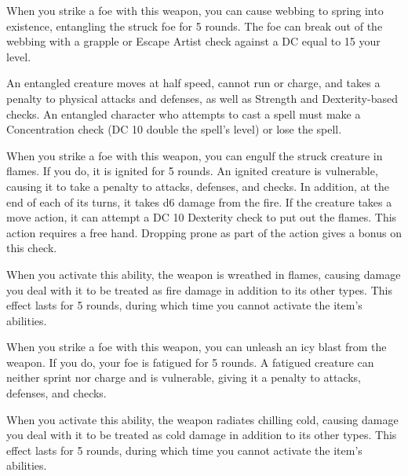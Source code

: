 
 When you strike a foe with this weapon, you can cause webbing to spring into existence, entangling the struck foe for 5 rounds. The foe can break out of the webbing with a grapple or Escape Artist check against a DC equal to 15 \add your level.

An entangled creature moves at half speed, cannot run or charge, and takes a  penalty to physical attacks and defenses, as well as Strength and Dexterity-based checks. An entangled character who attempts to cast a spell must make a Concentration check (DC 10 \add double the spell's level) or lose the spell.


 When you strike a foe with this weapon, you can engulf the struck creature in flames. If you do, it is ignited for 5 rounds. An ignited creature is vulnerable, causing it to take a  penalty to attacks, defenses, and checks. In addition, at the end of each of its turns, it takes d6 damage from the fire. If the creature takes a move action, it can attempt a DC 10 Dexterity check to put out the flames. This action requires a free hand. Dropping prone as part of the action gives a  bonus on this check.

When you activate this ability, the weapon is wreathed in flames, causing damage you deal with it to be treated as fire damage in addition to its other types. This effect lasts for 5 rounds, during which time you cannot activate the item's abilities.


 When you strike a foe with this weapon, you can unleash an icy blast from the weapon. If you do, your foe is fatigued for 5 rounds. A fatigued creature can neither sprint nor charge and is vulnerable, giving it a  penalty to attacks, defenses, and checks.

When you activate this ability, the weapon radiates chilling cold, causing damage you deal with it to be treated as cold damage in addition to its other types. This effect lasts for 5 rounds, during which time you cannot activate the item's abilities.

